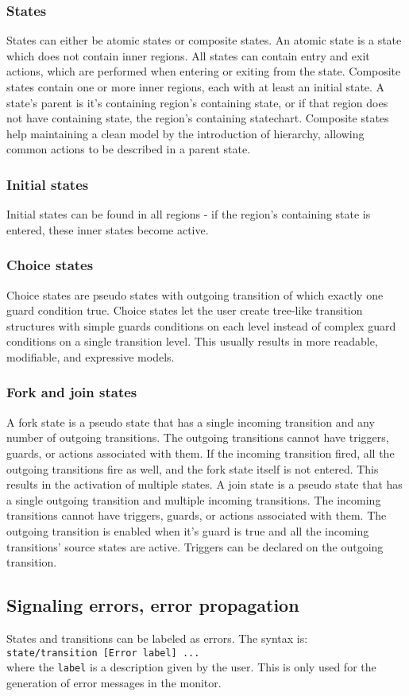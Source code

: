 {    \subsubsection{States}
States can either be atomic states or composite states. An atomic state is a state which does not contain inner regions. All states can contain entry and exit actions, which are performed when entering or exiting from the state. Composite states contain one or more inner regions, each with at least an initial state. A state's parent is it's containing region's containing state, or if that region does not have containing state, the region's containing statechart. Composite states help maintaining a clean model by the introduction of hierarchy, allowing common actions to be described in a parent state.
    \subsubsection{Initial states}
Initial states can be found in all regions - if the region's containing state is entered, these inner states become active.
    \subsubsection{Choice states}
Choice states are pseudo states with outgoing transition of which exactly one guard condition true. Choice states let the user create tree-like transition structures with simple guards conditions on each level instead of complex guard conditions on a single transition level. This usually results in more readable, modifiable, and expressive models.
    \subsubsection{Fork and join states}
A fork state is a pseudo state that has a single incoming transition and any number of outgoing transitions. The outgoing transitions cannot have triggers, guards, or actions associated with them. If the incoming transition fired, all the outgoing transitions fire as well, and the fork state itself is not entered. This results in the activation of multiple states.
A join state is a pseudo state that has a single outgoing transition and multiple incoming transitions. The incoming transitions cannot have triggers, guards, or actions associated with them. The outgoing transition is enabled when it's guard is true and all the incoming transitions' source states are active. Triggers can be declared on the outgoing transition.
  \subsection{Signaling errors, error propagation}
States and transitions can be labeled as errors. The syntax is: \\\verb!state/transition [Error label] ...!\\ where the \verb!label! is a description given by the user. This is only used for the generation of error messages in the monitor.
}
